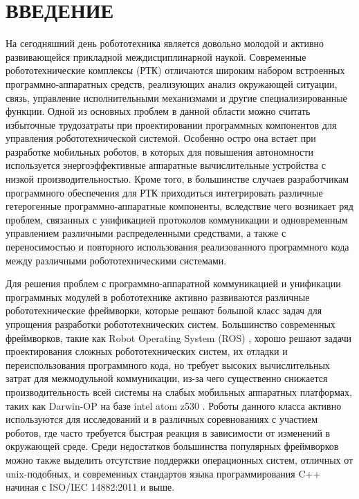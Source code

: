 \chapter*{ВВЕДЕНИЕ}

На сегодняшний день робототехника является довольно молодой и 
активно развивающейся прикладной междисциплинарной наукой. 
Современные робототехнические комплексы (РТК) отличаются широким 
набором встроенных программно-аппаратных средств, реализующих 
анализ окружающей ситуации, связь, управление исполнительными 
механизмами и другие специализированные функции. 
Одной из основных проблем в данной области можно считать 
избыточные трудозатраты при проектировании программных 
компонентов для управления робототехнической системой. Особенно 
остро она встает при разработке мобильных роботов, в которых для 
повышения автономности используется энергоэффективные аппаратные 
вычислительные устройства с низкой производительностью. Кроме 
того, в большинстве случаев разработчикам программного 
обеспечения для РТК приходиться интегрировать различные 
гетерогенные программно-аппаратные компоненты, вследствие чего 
возникает ряд проблем, связанных с унификацией протоколов 
коммуникации и одновременным управлением различными 
распределенными средствами, а также с переносимостью и 
повторного использования реализованного программного кода между 
различными робототехническими системами.

Для решения проблем с программно-аппаратной коммуникацией и унификации 
программных модулей в робототехнике активно развиваются различные 
робототехнические фреймворки, которые решают большой класс задач 
для упрощения разработки робототехнических систем. Большинство 
современных фреймворков, такие как Robot Operating System (ROS) 
\cite{quigley2009ros}, хорошо решают задачи проектирования 
сложных робототехнических систем, их отладки и переиспользования 
программного кода, но требует высоких вычислительных затрат для 
межмодульной коммуникации, из-за чего существенно снижается 
производительность всей системы на слабых мобильных аппаратных 
платформах, таких как Darwin-OP на базе intel atom z530 
\cite{ha2011development}. Роботы данного класса активно 
используются для исследований и в различных соревнованиях с 
участием роботов, где часто требуется быстрая реакция в 
зависимости от изменений в окружающей среде. Среди недостатков 
большинства популярных фреймворков можно также выделить 
отсутствие поддержки операционных систем, отличных от 
unix-подобных, и современных стандартов языка программирования 
C++ начиная с ISO/IEC 14882:2011 \cite{c++2011iso} и выше.

